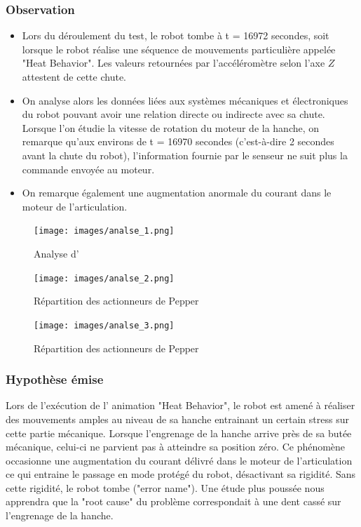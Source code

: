 \subsubsection{Observation}
\begin{itemize}
	\item Lors du déroulement du test, le robot tombe à t = 16972 secondes, soit lorsque le robot réalise une séquence de mouvements particulière appelée "Heat Behavior". Les valeurs retournées par l'accéléromètre selon l'axe $Z$ attestent de cette chute.	
	\item On analyse alors les données liées aux systèmes mécaniques et électroniques du robot pouvant avoir une relation directe ou indirecte avec sa chute.  Lorsque l'on étudie la vitesse de rotation du moteur de la hanche, on remarque qu'aux environs de  t = 16970 secondes (c'est-à-dire 2 secondes avant la chute du robot), l'information fournie par le senseur ne suit plus la commande  envoyée au moteur.
	\item On remarque également une augmentation anormale du courant dans le moteur de l'articulation. 
\end{itemize} 

\begin{figure}[h]
	\centering\texttt{[image: images/analse\_1.png]}
	\caption{Analyse d'}
	\label{fig:Répartition des actionneurs de Pepper}
\end{figure}

\begin{figure}[h]
	\centering\texttt{[image: images/analse\_2.png]}
	\caption{Répartition des actionneurs de Pepper}
	\label{fig:Répartition des actionneurs de Pepper}
\end{figure}

\begin{figure}[h]
	\centering\texttt{[image: images/analse\_3.png]}
	\caption{Répartition des actionneurs de Pepper}
	\label{fig:Répartition des actionneurs de Pepper}
\end{figure}

\subsubsection{Hypothèse émise}
 Lors de l'exécution de l' animation "Heat Behavior", le robot est amené à réaliser des mouvements amples au niveau de sa hanche entrainant un certain stress sur cette partie mécanique. Lorsque l'engrenage de la hanche arrive près de sa butée mécanique, celui-ci ne parvient pas à atteindre sa position zéro.  Ce phénomène occasionne une augmentation du courant délivré dans le moteur de l'articulation ce qui entraine le passage en mode protégé du robot, désactivant sa rigidité.  Sans cette rigidité, le robot tombe ("error name"). Une étude plus poussée nous apprendra que la "root cause" du problème correspondait à une dent cassé sur l'engrenage de la hanche. 


